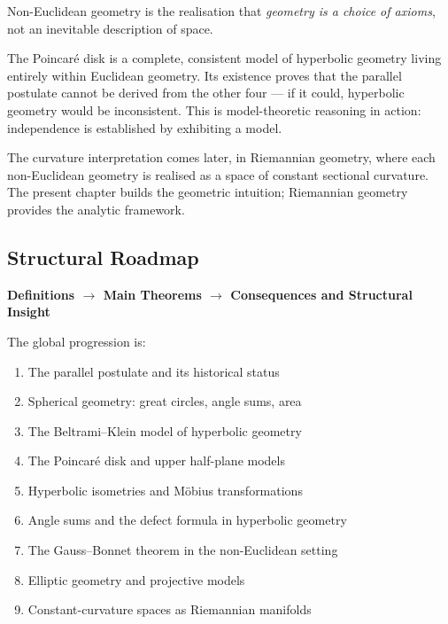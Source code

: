\begin{tcolorbox}[
  colback=gray!6,
  colframe=gray!40,
  arc=2pt,
  left=8pt, right=8pt, top=6pt, bottom=6pt,
  title={\small\textbf{Structural Role: Non-Euclidean Geometry — Geometry is a Choice}},
  fonttitle=\small\bfseries
]
Non-Euclidean geometry is the realisation that \emph{geometry
is a choice of axioms}, not an inevitable description of space.

The Poincar\'e disk is a complete, consistent model of hyperbolic
geometry living entirely within Euclidean geometry.
Its existence proves that the parallel postulate cannot be
derived from the other four --- if it could, hyperbolic geometry
would be inconsistent.
This is model-theoretic reasoning in action: independence is
established by exhibiting a model.

The curvature interpretation comes later, in Riemannian geometry,
where each non-Euclidean geometry is realised as a space of
constant sectional curvature.
The present chapter builds the geometric intuition; Riemannian
geometry provides the analytic framework.
\end{tcolorbox}
\vspace{1em}

\subsection*{Structural Roadmap}

\begin{center}
\textbf{Definitions $\longrightarrow$ Main Theorems
$\longrightarrow$ Consequences and Structural Insight}
\end{center}

The global progression is:

\begin{enumerate}
  \item The parallel postulate and its historical status
  \item Spherical geometry: great circles, angle sums, area
  \item The Beltrami--Klein model of hyperbolic geometry
  \item The Poincar\'e disk and upper half-plane models
  \item Hyperbolic isometries and M\"obius transformations
  \item Angle sums and the defect formula in hyperbolic geometry
  \item The Gauss--Bonnet theorem in the non-Euclidean setting
  \item Elliptic geometry and projective models
  \item Constant-curvature spaces as Riemannian manifolds
\end{enumerate}


